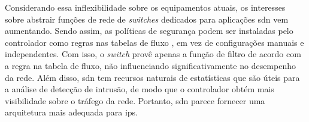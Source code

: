 Considerando essa inflexibilidade sobre os equipamentos atuais, os interesses sobre abstrair funções de rede de \textit{switches} dedicados para aplicações \gls{sdn} vem aumentando. Sendo assim, as políticas de segurança podem ser instaladas pelo controlador como regras nas tabelas de fluxo \cite{Kim:2013}, em vez de configurações manuais e independentes. Com isso, o \textit{switch} provê apenas a função de filtro de acordo com a regra na tabela de fluxo, não influenciando significativamente no desempenho da rede. Além disso, \gls{sdn} tem recursos naturais de estatísticas que são úteis para a análise de detecção de intrusão, de modo que o controlador obtém mais visibilidade sobre o tráfego da rede. Portanto, \gls{sdn} parece fornecer uma arquitetura mais adequada para \gls{ips}.